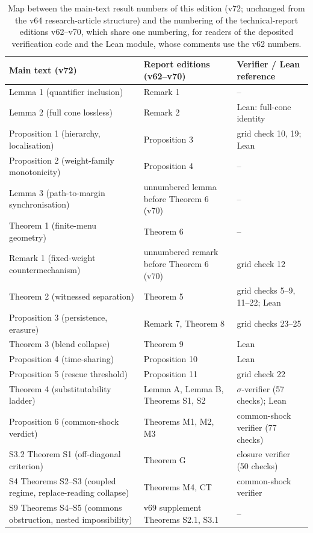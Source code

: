 \documentclass[preprint,11pt,authoryear]{elsarticle}
\theoremstyle{remark}
\begin{document}
\begin{table}[!htbp]
\centering\small
\caption{Map between the main-text result numbers of this edition (v72; unchanged from the v64 research-article structure) and the numbering of the technical-report editions v62--v70, which share one numbering, for readers of the deposited verification code and the Lean module, whose comments use the v62 numbers.}
\begin{tabularx}{\textwidth}{@{}>{\raggedright\arraybackslash}p{}>{\raggedright\arraybackslash}p{}X@{}}
\toprule
Main text (v72) & Report editions (v62--v70) & Verifier / Lean reference \\
\midrule
Lemma 1 (quantifier inclusion) & Remark 1 & -- \\
Lemma 2 (full cone lossless) & Remark 2 & Lean: full-cone identity \\
Proposition 1 (hierarchy, localisation) & Proposition 3 & grid check 10, 19; Lean \\
Proposition 2 (weight-family monotonicity) & Proposition 4 & -- \\
Lemma 3 (path-to-margin synchronisation) & unnumbered lemma before Theorem 6 (v70) & -- \\
Theorem 1 (finite-menu geometry) & Theorem 6 & -- \\
Remark 1 (fixed-weight countermechanism) & unnumbered remark before Theorem 6 (v70) & grid check 12 \\
Theorem 2 (witnessed separation) & Theorem 5 & grid checks 5--9, 11--22; Lean \\
Proposition 3 (persistence, erasure) & Remark 7, Theorem 8 & grid checks 23--25 \\
Theorem 3 (blend collapse) & Theorem 9 & Lean \\
Proposition 4 (time-sharing) & Proposition 10 & Lean \\
Proposition 5 (rescue threshold) & Proposition 11 & grid check 22 \\
Theorem 4 (substitutability ladder) & Lemma A, Lemma B, Theorems S1, S2 & $\sigma$-verifier (57 checks); Lean \\
Proposition 6 (common-shock verdict) & Theorems M1, M2, M3 & common-shock verifier (77 checks) \\
S3.2 Theorem S1 (off-diagonal criterion) & Theorem G & closure verifier (50 checks) \\
S4 Theorems S2--S3 (coupled regime, replace-reading collapse) & Theorems M4, CT & common-shock verifier \\
S9 Theorems S4--S5 (commons obstruction, nested impossibility) & v69 supplement Theorems S2.1, S3.1 & -- \\
\bottomrule
\end{tabularx}
\end{table}
\end{document}
